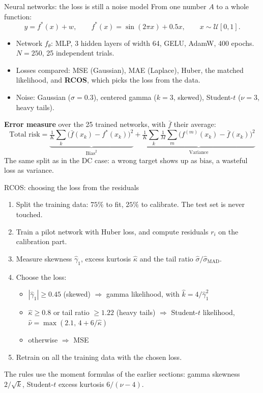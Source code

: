 \documentclass[aspectratio=169, 11pt]{beamer}
\begin{document}

\begin{frame}{Neural networks: the loss is still a noise model}
  \small
  From one number $A$ to a whole function:
  \[
    y = f^*(x) + w, \qquad f^*(x) = \sin(2\pi x) + 0.5x, \qquad x \sim \mathcal{U}[0, 1].
  \]
  \begin{itemize}
    \item Network $f_\theta$: MLP, 3 hidden layers of width 64, GELU, AdamW, 400 epochs. $N = 250$, 25 independent trials.
    \item Losses compared: MSE (Gaussian), MAE (Laplace), Huber, the matched likelihood, and \textbf{RCOS}, which picks the loss from the data.
    \item Noise: Gaussian ($\sigma = 0.3$), centered gamma ($k = 3$, skewed), Student-$t$ ($\nu = 3$, heavy tails).
  \end{itemize}
  \textbf{Error measure} over the 25 trained networks, with $\bar f$ their average:
  \[
    \text{Total risk} = \underbrace{\tfrac{1}{K}\textstyle\sum_k \big(\bar f(x_k) - f^*(x_k)\big)^2}_{\text{Bias}^2}
    + \underbrace{\tfrac{1}{K}\textstyle\sum_k \tfrac{1}{M}\sum_m \big(f^{(m)}(x_k) - \bar f(x_k)\big)^2}_{\text{Variance}}
  \]
  The same split as in the DC case: a wrong target shows up as bias, a wasteful loss as variance.
\end{frame}

\begin{frame}{RCOS: choosing the loss from the residuals}
  \small
  \begin{enumerate}
    \item Split the training data: $75\%$ to fit, $25\%$ to calibrate. The test set is never touched.
    \item Train a pilot network with Huber loss, and compute residuals $r_i$ on the calibration part.
    \item Measure skewness $\hat\gamma_1$, excess kurtosis $\hat\kappa$ and the tail ratio $\hat\sigma / \hat\sigma_{\text{MAD}}$.
    \item Choose the loss:
      \begin{itemize}
        \item $|\hat\gamma_1| \ge 0.45$ (skewed) $\Rightarrow$ gamma likelihood, with $\hat k = 4/\hat\gamma_1^2$
        \item $\hat\kappa \ge 0.8$ or tail ratio $\ge 1.22$ (heavy tails) $\Rightarrow$ Student-$t$ likelihood, $\hat\nu = \max(2.1,\, 4 + 6/\hat\kappa)$
        \item otherwise $\Rightarrow$ MSE
      \end{itemize}
    \item Retrain on all the training data with the chosen loss.
  \end{enumerate}
  \vspace{0.3em}
  The rules use the moment formulas of the earlier sections: gamma skewness $2/\sqrt{k}$, Student-$t$ excess kurtosis $6/(\nu - 4)$.
\end{frame}
\end{document}
